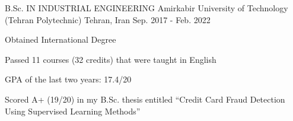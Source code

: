 

\begin{cventries}

  \cventry
    {B.Sc. IN INDUSTRIAL ENGINEERING} %
    {Amirkabir University of Technology (Tehran Polytechnic)} %
    {Tehran, Iran} %
    {Sep. 2017 - Feb. 2022} %
    {
      \begin{cvitems} %
        \item {Obtained International Degree}
        \item {Passed 11 courses (32 credits) that were taught in English}
        \item {GPA of the last two years: 17.4/20}
        \item {Scored A+ (19/20) in my B.Sc. thesis entitled ``Credit Card Fraud Detection Using Supervised Learning Methods''}
      \end{cvitems}
    }

\end{cventries}
